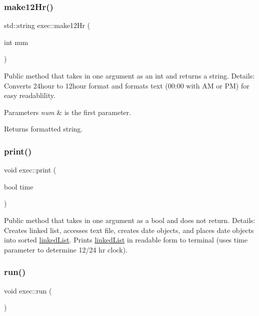 \subsubsection{\texorpdfstring{make12\+Hr()}{make12Hr()}}
{\footnotesize\ttfamily std\+::string exec\+::make12\+Hr (\begin{DoxyParamCaption}\item[{int}]{num }\end{DoxyParamCaption})}

Public method that takes in one argument as an int and returns a string. Details\+: Converts 24hour to 12hour format and formats text (00\+:00 with AM or PM) for easy readablility. 
\begin{DoxyParams}{Parameters}
{\em num} & is the first parameter. \\
\hline
\end{DoxyParams}
\begin{DoxyReturn}{Returns}
formatted string. 
\end{DoxyReturn}
\mbox{\label{classexec_a4cf771a565711689023aa75141f82c52}} 
\subsubsection{\texorpdfstring{print()}{print()}}
{\footnotesize\ttfamily void exec\+::print (\begin{DoxyParamCaption}\item[{bool}]{time }\end{DoxyParamCaption})}

Public method that takes in one argument as a bool and does not return. Details\+: Creates linked list, accesses text file, creates date objects, and places date objects into sorted \hyperlink{classlinked_list}{linked\+List}. Prints \hyperlink{classlinked_list}{linked\+List} in readable form to terminal (uses time parameter to determine 12/24 hr clock). \mbox{\label{classexec_aad3ea9a2cd99fc28471062719b85b1f6}} 
\subsubsection{\texorpdfstring{run()}{run()}}
{\footnotesize\ttfamily void exec\+::run (\begin{DoxyParamCaption}{ }\end{DoxyParamCaption})}

